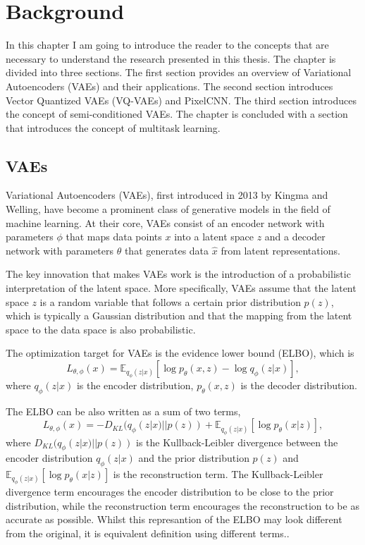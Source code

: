 \chapter{Background}

In this chapter I am going to introduce the reader to the concepts that are necessary to understand the research presented in this thesis. The chapter is divided into three sections. The first section provides an overview of Variational Autoencoders (VAEs) and their applications. The second section introduces Vector Quantized VAEs (VQ-VAEs) and PixelCNN. The third section introduces the concept of semi-conditioned VAEs. The chapter is concluded with a section that introduces the concept of multitask learning. 

\section{VAEs}

Variational Autoencoders (VAEs), first introduced in 2013 by Kingma and Welling\cite{kingma2013autoencoding}, have become a prominent class of generative models in the field of machine learning.  At their core, VAEs consist of an encoder network with parameters $\phi$ that maps data points $x$ into a latent space $z$ and a decoder network with parameters $\theta$ that generates data $\hat{x}$ from latent representations\cite{Kingma_2019}. 

The key innovation that makes VAEs work is the introduction of a probabilistic interpretation of the latent space. More specifically, VAEs assume that the latent space $z$ is a random variable that follows a certain prior distribution $p(z)$, which is typically a Gaussian distribution and that the mapping from the latent space to the data space is also probabilistic\cite{kingma2013autoencoding}.

The optimization target for VAEs is the evidence lower bound (ELBO), which is
 \[ L_{\theta, \phi}(x) = \mathbb{E}_{q_{\phi}(z|x)} [\log p_{\theta}(x, z) - \log q_{\phi}(z|x)], \]
where $q_{\phi}(z|x)$ is the encoder distribution, $p_{\theta}(x, z)$ is the decoder distribution. 

The ELBO can be also written as a sum of two terms,
 \[ L_{\theta, \phi}(x) = - D_{KL}(q_{\phi}(z|x) || p(z)) + \mathbb{E}_{q_{\phi}(z|x)} [\log p_{\theta}(x|z)], \]
 where $D_{KL}(q_{\phi}(z|x) || p(z))$ is the Kullback-Leibler divergence between the encoder distribution $q_{\phi}(z|x)$ and the prior distribution $p(z)$ and $\mathbb{E}_{q_{\phi}(z|x)} [\log p_{\theta}(x|z)]$ is the reconstruction term. The Kullback-Leibler divergence term encourages the encoder distribution to be close to the prior distribution, while the reconstruction term encourages the reconstruction to be as accurate as possible. Whilst this represantion of the ELBO may look different from the original, it is equivalent definition using different terms.\cite{Kingma_2019}.


